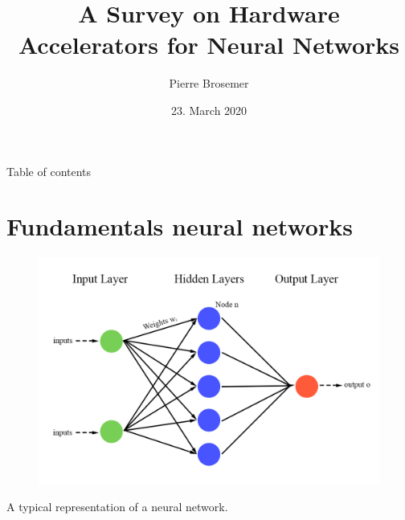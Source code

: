 \documentclass[en]{sdqbeamer}
\title[Hardware Accelerators for Neural Networks]{A Survey on Hardware Accelerators for Neural Networks}
\author[Pierre Brosemer]{Pierre Brosemer}
\date[23.\,03.\,2020]{23. March 2020}
\begin{document}
	
\KITtitleframe

\begin{frame}{Table of contents}
\tableofcontents
\end{frame}

\section{Fundamentals neural networks}
\begin{frame}
	\begin{figure}
		\includegraphics[width= 0.6\paperwidth]{pictures/neuralnetwork.png}
	\end{figure}
	\centering
	A typical representation of a neural network.
\end{frame}
\end{document}
